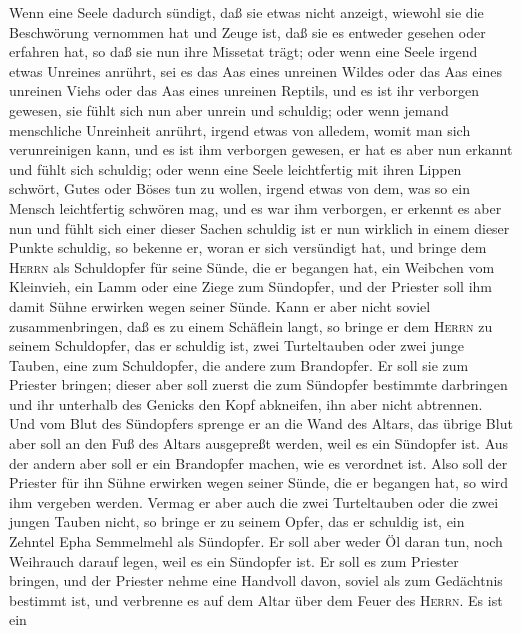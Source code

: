  Wenn eine Seele dadurch sündigt, daß sie etwas nicht
anzeigt, wiewohl sie die Beschwörung vernommen hat und Zeuge ist, daß
sie es entweder gesehen oder erfahren hat, so daß sie nun ihre Missetat
trägt;  oder wenn eine Seele irgend etwas Unreines
anrührt, sei es das Aas eines unreinen Wildes oder das Aas eines
unreinen Viehs oder das Aas eines unreinen Reptils, und es ist ihr
verborgen gewesen, sie fühlt sich nun aber unrein und schuldig;
 oder wenn jemand menschliche Unreinheit anrührt, irgend
etwas von alledem, womit man sich verunreinigen kann, und es ist ihm
verborgen gewesen, er hat es aber nun erkannt und fühlt sich schuldig;
 oder wenn eine Seele leichtfertig mit ihren Lippen
schwört, Gutes oder Böses tun zu wollen, irgend etwas von dem, was so
ein Mensch leichtfertig schwören mag, und es war ihm verborgen, er
erkennt es aber nun und fühlt sich einer dieser Sachen schuldig
 ist er nun wirklich in einem dieser Punkte schuldig, so
bekenne er, woran er sich versündigt hat,  und bringe dem
\textsc{Herrn} als Schuldopfer für seine Sünde, die er begangen hat, ein
Weibchen vom Kleinvieh, ein Lamm oder eine Ziege zum Sündopfer, und der
Priester soll ihm damit Sühne erwirken wegen seiner Sünde.
 Kann er aber nicht soviel zusammenbringen, daß es zu
einem Schäflein langt, so bringe er dem \textsc{Herrn} zu seinem
Schuldopfer, das er schuldig ist, zwei Turteltauben oder zwei junge
Tauben, eine zum Schuldopfer, die andere zum Brandopfer. 
Er soll sie zum Priester bringen; dieser aber soll zuerst die zum
Sündopfer bestimmte darbringen und ihr unterhalb des Genicks den Kopf
abkneifen, ihn aber nicht abtrennen.  Und vom Blut des
Sündopfers sprenge er an die Wand des Altars, das übrige Blut aber soll
an den Fuß des Altars ausgepreßt werden, weil es ein Sündopfer ist.
 Aus der andern aber soll er ein Brandopfer machen, wie
es verordnet ist. Also soll der Priester für ihn Sühne erwirken wegen
seiner Sünde, die er begangen hat, so wird ihm vergeben werden.
 Vermag er aber auch die zwei Turteltauben oder die zwei
jungen Tauben nicht, so bringe er zu seinem Opfer, das er schuldig ist,
ein Zehntel Epha Semmelmehl als Sündopfer. Er soll aber weder Öl daran
tun, noch Weihrauch darauf legen, weil es ein Sündopfer ist.
 Er soll es zum Priester bringen, und der Priester nehme
eine Handvoll davon, soviel als zum Gedächtnis bestimmt ist, und
verbrenne es auf dem Altar über dem Feuer des \textsc{Herrn}. Es ist ein
